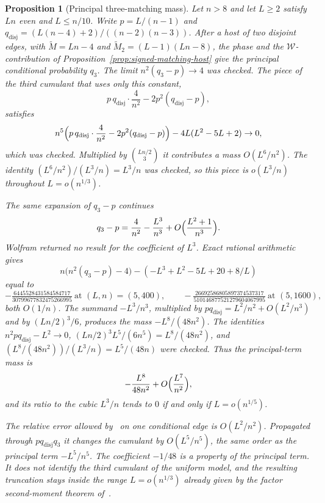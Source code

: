 \documentclass[11pt]{article}
\newtheorem{proposition}[theorem]{Proposition}
\begin{document}
\begin{proposition}[Principal three-matching mass]
\label{prop:triple-mass-order}
Let \(n>8\) and let \(L\ge 2\) satisfy \(Ln\) even and \(L\le n/10\).
Write \(p=L/(n-1)\) and
\(q_{\mathrm{disj}}=(L(n-4)+2)/((n-2)(n-3))\).
After a host of two disjoint edges, with
\(\widetilde M=Ln-4\) and \(\widetilde M_2=(L-1)(Ln-8)\), the phase and the
\(\mathcal W\)-contribution of Proposition~\ref{prop:signed-matching-host}
give the principal conditional probability \(q_3\).
The limit \(n^2(q_3-p)\to 4\) was checked.
The piece of the third cumulant that uses only this constant,
\[
p\,q_{\mathrm{disj}}\cdot\frac4{n^2}-2p^2(q_{\mathrm{disj}}-p),
\]
satisfies
\[
n^5\Bigl(p\,q_{\mathrm{disj}}\cdot\frac4{n^2}-2p^2(q_{\mathrm{disj}}-p)\Bigr)
-4L(L^2-5L+2)\to 0,
\]
which was checked. Multiplied by \(\binom{Ln/2}{3}\) it contributes a mass
\(O(L^6/n^2)\). The identity \((L^6/n^2)/(L^3/n)=L^3/n\) was checked, so this
piece is \(o(L^3/n)\) throughout \(L=o(n^{1/3})\).

The same expansion of \(q_3-p\) continues
\[
q_3-p=\frac4{n^2}-\frac{L^3}{n^3}+O\Bigl(\frac{L^2+1}{n^3}\Bigr).
\]
Wolfram returned no result for the coefficient of \(L^3\). Exact rational
arithmetic gives
\[
n\bigl(n^2(q_3-p)-4\bigr)-(-L^3+L^2-5L+20+8/L)
\]
equal to
\[
-\tfrac{6445528431584584717}{30799677832475266995}\ \text{at }(L,n)=(5,400),
\qquad
-\tfrac{26692586805897374537317}{510146877521279604067995}\ \text{at }(5,1600),
\]
both \(O(1/n)\). The summand \(-L^3/n^3\), multiplied by
\(p q_{\mathrm{disj}}=L^2/n^2+O(L^2/n^3)\) and by \((Ln/2)^3/6\), produces the
mass \(-L^8/(48n^2)\). The identities
\(n^2 p q_{\mathrm{disj}}-L^2\to 0\),
\((Ln/2)^3 L^5/(6n^5)=L^8/(48n^2)\), and
\((L^8/(48n^2))/(L^3/n)=L^5/(48n)\) were checked.
Thus the principal-term mass is
\[
-\frac{L^8}{48n^2}+O\Bigl(\frac{L^7}{n^2}\Bigr),
\]
and its ratio to the cubic \(L^3/n\) tends to \(0\) if and only if
\(L=o(n^{1/5})\).

The relative error allowed by~\cite[Theorem~6]{Gao20} on one conditional
edge is \(O(L^2/n^2)\). Propagated through \(p q_{\mathrm{disj}} q_3\) it
changes the cumulant by \(O(L^5/n^5)\), the same order as the principal term
\(-L^5/n^5\). The coefficient \(-1/48\) is a property of the principal term.
It does not identify the third cumulant of the uniform model, and the
resulting truncation stays inside the range \(L=o(n^{1/3})\) already given by
the factor second-moment theorem of~\cite{PlusOneV1}.
\end{proposition}
\end{document}
